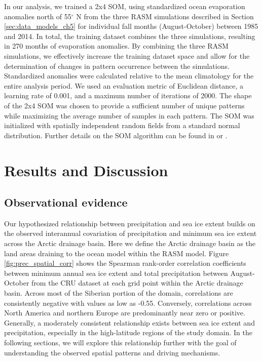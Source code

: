 In our analysis, we trained a 2x4 SOM, using standardized ocean evaporation anomalies north of 55$^{\circ}$ N from the three RASM simulations described in Section \ref{sec:data_models_ch5} for individual fall months (August-October) between 1985 and 2014.
In total, the training dataset combines the three simulations, resulting in 270 months of evaporation anomalies.
By combining the three RASM simulations, we effectively increase the training dataset space and allow for the determination of changes in pattern occurrence between the simulations.
Standardized anomalies were calculated relative to the mean climatology for the entire analysis period.
We used an evaluation metric of Euclidean distance, a learning rate of 0.001, and a maximum number of iterations of 2000.
The shape of the 2x4 SOM was chosen to provide a sufficient number of unique patterns while maximizing the average number of samples in each pattern.
The SOM was initialized with spatially independent random fields from a standard normal distribution.
Further details on the SOM algorithm can be found in \citet{Reusch_2005} or \citet{Cassano_2015}.

\section{Results and Discussion}
\label{sec:results_ch5}
\subsection{Observational evidence}
Our hypothesized relationship between precipitation and sea ice extent builds on the observed interannual covariation of precipitation and minimum sea ice extent across the Arctic drainage basin.
Here we define the Arctic drainage basin as the land areas draining to the ocean model within the RASM model.
Figure \ref{fig:prec_spatial_corr} shows the Spearman rank-order correlation coefficients between minimum annual sea ice extent and total precipitation between August-October from the CRU dataset at each grid point within the Arctic drainage basin.
Across most of the Siberian portion of the domain, correlations are consistently negative with values as low as -0.55.
Conversely, correlations across North America and northern Europe are predominantly near zero or positive.
Generally, a moderately consistent relationship exists between sea ice extent and precipitation, especially in the high-latitude regions of the study domain.
In the following sections, we will explore this relationship further with the goal of understanding the observed spatial patterns and driving mechanisms.

